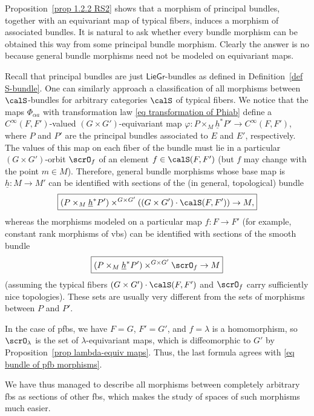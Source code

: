 \begin{rem}
    Proposition~\ref{prop 1.2.2 RS2} shows that a morphism of principal bundles, together with an equivariant map of typical fibers, induces a morphism of associated bundles. It is natural to ask whether every bundle morphism can be obtained this way from some principal bundle morphism. Clearly the answer is no because general bundle morphisms need not be modeled on equivariant maps.
    
    Recall that principal bundles are just $\mathsf{LieGr}$-bundles as defined in Definition~\ref{def S-bundle}. One can similarly approach a classification of all morphisms between $\calS$-bundles for arbitrary categories $\calS$ of typical fibers. We notice that the maps $\Phi_{\alpha a}$ with transformation law \eqref{eq transformation of Phiab} define a $C^\infty(F,F')$-valued $(G\times G')$-equivariant map $\varphi:P\times_M \underline{h}^\ast P'\to C^\infty(F,F')$, where $P$ and $P'$ are the principal bundles associated to $E$ and $E'$, respectively. The values of this map on each fiber of the bundle must lie in a particular $(G\times G')$-orbit $\scrO_f$ of an element $f\in \calS(F,F')$ (but $f$ may change with the point $m \in M$). Therefore, general bundle morphisms whose base map is $\underline{h}:M\to M'$ can be identified with sections of the (in general, topological) bundle
    \[\boxed{(P\times_M \underline{h}^\ast P')\times^{G\times G'}\left((G\times G')\cdot \calS(F,F')\right)\to M,}\] 
    whereas the morphisms modeled on a particular map $f:F\to F'$ (for example, constant rank morphisms of \glspl{vb}) can be identified with sections of the smooth bundle
    \[\boxed{(P\times_M \underline{h}^\ast P')\times^{G\times G'}\scrO_f\to M}\] 
    (assuming the typical fibers $(G\times G')\cdot \calS(F,F')$ and $\scrO_f$ carry sufficiently nice topologies). These sets are usually very different from the sets of morphisms between $P$ and $P'$. 
    
    In the case of \glspl{pfb}, we have $F=G$, $F'=G'$, and $f=\lambda$ is a homomorphism, so $\scrO_\lambda$ is the set of $\lambda$-equivariant maps, which is diffeomorphic to $G'$ by Proposition~\ref{prop lambda-equiv maps}. Thus, the last formula agrees with \eqref{eq bundle of pfb morphisms}.
\end{rem}

We have thus managed to describe all morphisms between completely arbitrary \glspl{fb} as sections of other \glspl{fb}, which makes the study of spaces of such morphisms much easier.

